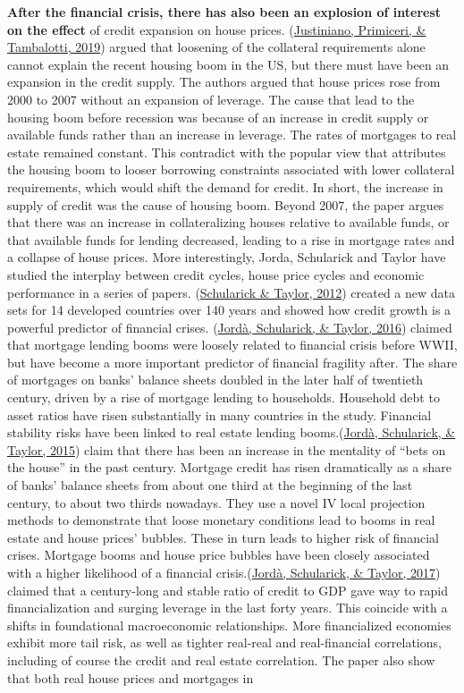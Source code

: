 \documentclass[
  12pt,
]{article}
\begin{document}
\textbf{After the financial crisis, there has also been an explosion of interest on the effect} of credit expansion on house prices. (\protect\hyperlink{ref-justiniano_credit_2019}{Justiniano, Primiceri, \& Tambalotti, 2019}) argued that loosening of the collateral requirements alone cannot explain the recent housing boom in the US, but there must have been an expansion in the credit supply. The authors argued that house prices rose from 2000 to 2007 without an expansion of leverage. The cause that lead to the housing boom before recession was because of an increase in credit supply or available funds rather than an increase in leverage. The rates of mortgages to real estate remained constant. This contradict with the popular view that attributes the housing boom to looser borrowing constraints associated with lower collateral requirements, which would shift the demand for credit. In short, the increase in supply of credit was the cause of housing boom. Beyond 2007, the paper argues that there was an increase in collateralizing houses relative to available funds, or that available funds for lending decreased, leading to a rise in mortgage rates and a collapse of house prices. More interestingly, Jorda, Schularick and Taylor have studied the interplay between credit cycles, house price cycles and economic performance in a series of papers. (\protect\hyperlink{ref-schularick_credit_2012}{Schularick \& Taylor, 2012}) created a new data sets for 14 developed countries over 140 years and showed how credit growth is a powerful predictor of financial crises. (\protect\hyperlink{ref-jorda_great_2016}{Jordà, Schularick, \& Taylor, 2016}) claimed that mortgage lending booms were loosely related to financial crisis before WWII, but have become a more important predictor of financial fragility after. The share of mortgages on banks' balance sheets doubled in the later half of twentieth century, driven by a rise of mortgage lending to households. Household debt to asset ratios have risen substantially in many countries in the study. Financial stability risks have been linked to real estate lending booms.(\protect\hyperlink{ref-jorda_betting_2015}{Jordà, Schularick, \& Taylor, 2015}) claim that there has been an increase in the mentality of ``bets on the house'' in the past century. Mortgage credit has risen dramatically as a share of banks' balance sheets from about one third at the beginning of the last century, to about two thirds nowadays. They use a novel IV local projection methods to demonstrate that loose monetary conditions lead to booms in real estate and house prices' bubbles. These in turn leads to higher risk of financial crises. Mortgage booms and house price bubbles have been closely associated with a higher likelihood of a financial crisis.(\protect\hyperlink{ref-jorda_macrofinancial_2017}{Jordà, Schularick, \& Taylor, 2017}) claimed that a century-long and stable ratio of credit to GDP gave way to rapid financialization and surging leverage in the last forty years. This coincide with a shifts in foundational macroeconomic relationships. More financialized economies exhibit more tail risk, as well as tighter real-real and real-financial correlations, including of course the credit and real estate correlation. The paper also show that both real house prices and mortgages in 
\end{document}
